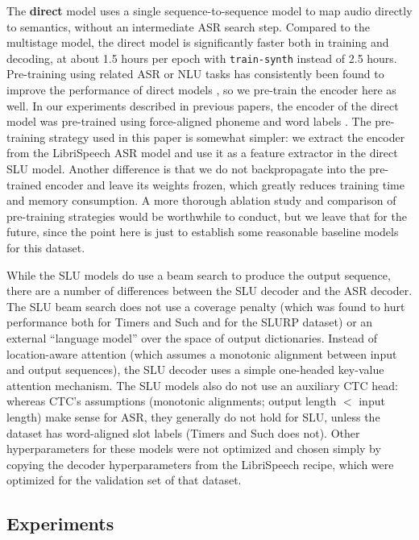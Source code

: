 \documentclass{article}
\begin{document}
The \textbf{direct} model uses a single sequence-to-sequence model to map audio directly to semantics, without an intermediate ASR search step. 
Compared to the multistage model, the direct model is significantly faster both in training and decoding, at about 1.5 hours per epoch with \texttt{train-synth} instead of 2.5 hours. 
Pre-training using related ASR or NLU tasks has consistently been found to improve the performance of direct models \cite{lugosch2019speech, wang2020large, huang2020leveraging, sharma2021leveraging, chung2021splat}, so we pre-train the encoder here as well. 
In our experiments described in previous papers, the encoder of the direct model was pre-trained using force-aligned phoneme and word labels \cite{lugosch2019speech, lugosch2020using}. The pre-training strategy used in this paper is somewhat simpler: we extract the encoder from the LibriSpeech ASR model and use it as a feature extractor in the direct SLU model. 
Another difference is that we do not backpropagate into the pre-trained encoder and leave its weights frozen, which greatly reduces training time and memory consumption. A more thorough ablation study and comparison of pre-training strategies would be worthwhile to conduct, but we leave that for the future, since the point here is just to establish some reasonable baseline models for this dataset.

While the SLU models do use a beam search to produce the output sequence, there are a number of differences between the SLU decoder and the ASR decoder. The SLU beam search does not use a coverage penalty (which was found to hurt performance both for Timers and Such and for the SLURP dataset) or an external ``language model'' over the space of output dictionaries. Instead of location-aware attention (which assumes a monotonic alignment between input and output sequences), the SLU decoder uses a simple one-headed key-value attention mechanism. The SLU models also do not use an auxiliary CTC head: whereas CTC's assumptions (monotonic alignments; output length $<$ input length) make sense for ASR, they generally do not hold for SLU, unless the dataset has word-aligned slot labels (Timers and Such does not). Other hyperparameters for these models were not optimized and chosen simply by copying the decoder hyperparameters from the LibriSpeech recipe, which were optimized for the validation set of that dataset.

\subsection{Experiments}\label{experiments}
\end{document}
